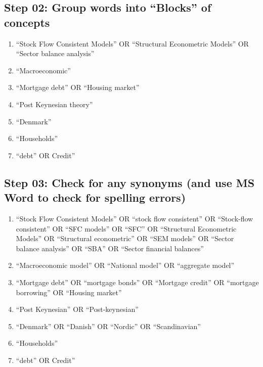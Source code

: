 \documentclass[
]{book}
\providecommand{\tightlist}{%
  \setlength{\itemsep}{0pt}\setlength{\parskip}{0pt}}
\begin{document}
\hypertarget{step-02-group-words-into-blocks-of-concepts}{%
\subsection{Step 02: Group words into ``Blocks'' of concepts}\label{step-02-group-words-into-blocks-of-concepts}}

\begin{enumerate}
\def\labelenumi{\arabic{enumi}.}
\tightlist
\item
  ``Stock Flow Consistent Models'' OR ``Structural Econometric Models'' OR ``Sector balance analysis''
\item
  ``Macroeconomic''
\item
  ``Mortgage debt'' OR ``Housing market''
\item
  ``Post Keynesian theory''
\item
  ``Denmark''
\item
  ``Households''
\item
  ``debt'' OR Credit''
\end{enumerate}

\hypertarget{step-03-check-for-any-synonyms-and-use-ms-word-to-check-for-spelling-errors}{%
\subsection{Step 03: Check for any synonyms (and use MS Word to check for spelling errors)}\label{step-03-check-for-any-synonyms-and-use-ms-word-to-check-for-spelling-errors}}

\begin{enumerate}
\def\labelenumi{\arabic{enumi}.}
\tightlist
\item
  ``Stock Flow Consistent Models'' OR ``stock flow consistent'' OR ``Stock-flow consistent'' OR ``SFC models'' OR ``SFC'' OR ``Structural Econometric Models'' OR ``Structural econometric'' OR ``SEM models'' OR ``Sector balance analysis'' OR ``SBA'' OR ``Sector financial balances''
\item
  ``Macroeconomic model'' OR ``National model'' OR ``aggregate model''
\item
  ``Mortgage debt'' OR ``mortgage bonds'' OR ``Mortgage credit'' OR ``mortgage borrowing'' OR ``Housing market''
\item
  ``Post Keynesian'' OR ``Post-keynesian''
\item
  ``Denmark'' OR ``Danish'' OR ``Nordic'' OR ``Scandinavian''
\item
  ``Households''
\item
  ``debt'' OR Credit''
\end{enumerate}
\end{document}

